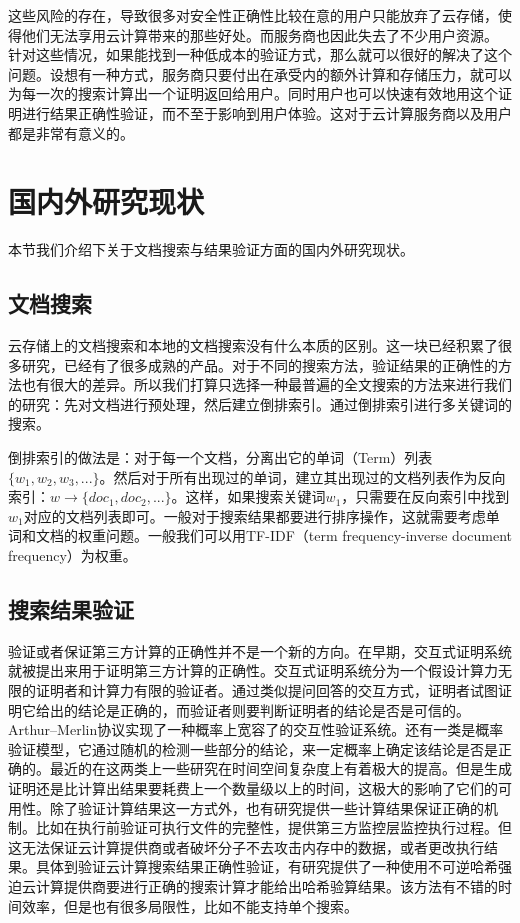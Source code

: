 这些风险的存在，导致很多对安全性正确性比较在意的用户只能放弃了云存储，使得他们无法享用云计算带来的那些好处。而服务商也因此失去了不少用户资源。
针对这些情况，如果能找到一种低成本的验证方式，那么就可以很好的解决了这个问题。设想有一种方式，服务商只要付出在承受内的额外计算和存储压力，就可以为每一次的搜索计算出一个证明返回给用户。同时用户也可以快速有效地用这个证明进行结果正确性验证，而不至于影响到用户体验。这对于云计算服务商以及用户都是非常有意义的。

\section{国内外研究现状}
本节我们介绍下关于文档搜索与结果验证方面的国内外研究现状。

\subsection{文档搜索}
云存储上的文档搜索和本地的文档搜索没有什么本质的区别。这一块已经积累了很多研究，已经有了很多成熟的产品。对于不同的搜索方法，验证结果的正确性的方法也有很大的差异。所以我们打算只选择一种最普遍的全文搜索的方法来进行我们的研究：先对文档进行预处理，然后建立倒排索引。通过倒排索引进行多关键词的搜索。

倒排索引的做法是：对于每一个文档，分离出它的单词（Term）列表$\{w_1,w_2,w_3,...\}$。然后对于所有出现过的单词，建立其出现过的文档列表作为反向索引：$w \to \{doc_1,doc_2,...\}$。这样，如果搜索关键词$w_1$，只需要在反向索引中找到$w_1$对应的文档列表即可。一般对于搜索结果都要进行排序操作，这就需要考虑单词和文档的权重问题。一般我们可以用TF-IDF（term frequency-inverse document frequency）为权重。
\subsection{搜索结果验证}
验证或者保证第三方计算的正确性并不是一个新的方向。在早期，交互式证明系统就被提出来用于证明第三方计算的正确性。交互式证明系统分为一个假设计算力无限的证明者和计算力有限的验证者。通过类似提问回答的交互方式，证明者试图证明它给出的结论是正确的，而验证者则要判断证明者的结论是否是可信的。Arthur–Merlin协议实现了一种概率上宽容了的交互性验证系统。还有一类是概率验证模型，它通过随机的检测一些部分的结论，来一定概率上确定该结论是否是正确的。最近的在这两类上一些研究在时间空间复杂度上有着极大的提高。但是生成证明还是比计算出结果要耗费上一个数量级以上的时间，这极大的影响了它们的可用性。除了验证计算结果这一方式外，也有研究提供一些计算结果保证正确的机制。比如在执行前验证可执行文件的完整性，提供第三方监控层监控执行过程。但这无法保证云计算提供商或者破坏分子不去攻击内存中的数据，或者更改执行结果。具体到验证云计算搜索结果正确性验证，有研究提供了一种使用不可逆哈希强迫云计算提供商要进行正确的搜索计算才能给出哈希验算结果。该方法有不错的时间效率，但是也有很多局限性，比如不能支持单个搜索。

